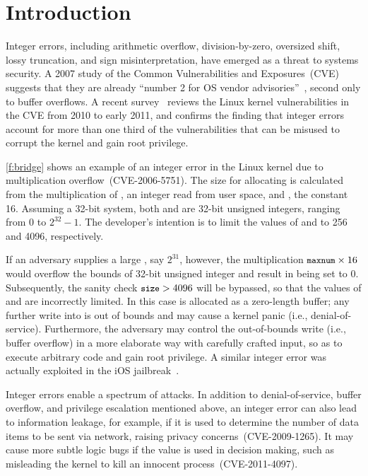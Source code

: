 \section{Introduction}
\label{s:intro}

Integer errors, including arithmetic overflow, division-by-zero,
oversized shift, lossy truncation, and sign misinterpretation, have
emerged as a threat to systems security.  A 2007 study of the
Common Vulnerabilities and Exposures~(CVE)~\cite{cve} suggests that
they are already ``number 2 for OS vendor
advisories''~\cite{christey:vuln}, second only to buffer overflows.
A recent survey~\cite{chen:kbugs} reviews the Linux kernel
vulnerabilities in the CVE from 2010 to early 2011, and confirms
the finding that integer errors account for more than one third of
the vulnerabilities that can be misused to corrupt the kernel and
gain root privilege.

\autoref{f:bridge} shows an example of an integer error in the Linux
kernel due to multiplication overflow~(CVE-2006-5751).  The size
for allocating  is calculated from the multiplication of
, an integer read from user space,
and , the constant 16.  Assuming
a 32-bit system, both  and  are 32-bit unsigned
integers, ranging from 0 to $2^{32} - 1$.  The developer's intention
is to limit the values of  and  to 256 and 4096,
respectively.

If an adversary supplies a large , say $2^{31}$, however,
the multiplication $\cc{maxnum} \times 16$ would overflow the bounds
of 32-bit unsigned integer and result in 
being set to 0.  Subsequently, the sanity check $\cc{size} > 4096$
will be bypassed, so that the values of  and 
are incorrectly limited.  In this case  is allocated as
a zero-length buffer; any further write into  is out of
bounds and may cause a kernel panic (i.e., denial-of-service).
Furthermore, the adversary may control the out-of-bounds write
(i.e., buffer overflow) in a more elaborate way with carefully
crafted input, so as to execute arbitrary code and gain root
privilege.  A similar integer error was actually exploited
in the iOS jailbreak~\cite{esser:ios}.

Integer errors enable a spectrum of attacks.  In addition to
denial-of-service, buffer overflow, and privilege escalation
mentioned above, an integer error can also lead to information
leakage, for example, if it is used to determine the number of data
items to be sent via network, raising privacy concerns~(CVE-2009-1265).
It may cause more subtle logic bugs if the value is used in decision
making, such as misleading the kernel to kill an innocent
process~(CVE-2011-4097).


